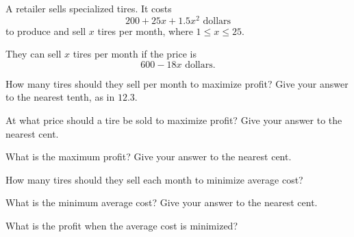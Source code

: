 
A retailer sells specialized tires.
It costs
\begin{equation*}
 200 + 25 x + 1.5 x^2 \text{ dollars}
\end{equation*}
to produce and sell $x$ tires per month,
where $1 \leq x \leq 25$.

They can sell $x$ tires per month if the price is
\begin{equation*}
 600 - 18 x \text{ dollars.}
\end{equation*}

\begin{ProblemSet}

 \begin{Problem}[pencil space=4in]
  How many tires should they sell per month to maximize profit?
  Give your answer to the nearest tenth, as in $12.3$.
 \end{Problem}

 \begin{Problem}[pencil space=1in]
  At what price should a tire be sold to maximize profit?
  Give your answer to the nearest cent.
 \end{Problem}

 \begin{Problem}[pencil space=1in]
  What is the maximum profit?
  Give your answer to the nearest cent.
 \end{Problem}

 \begin{Problem}[pencil space=5in]
  How many tires should they sell each month to minimize average cost?
 \end{Problem}

 \begin{Problem}[pencil space=1in]
  What is the minimum average cost?
  Give your answer to the nearest cent.
 \end{Problem}

 \begin{Problem}[pencil space=1in]
  What is the profit when the average cost is minimized?
 \end{Problem}

\end{ProblemSet}

